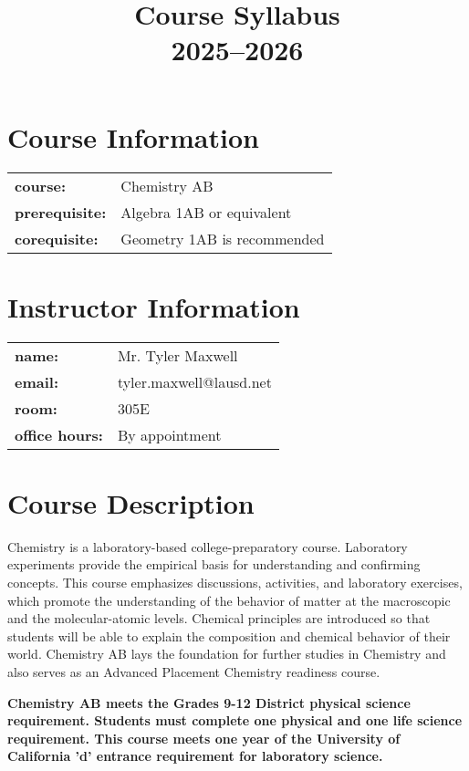 \documentclass[12pt]{article}
\title{\vspace{-1cm}\textbf{Course Syllabus}\\\large 2025–2026}
\author{}
\date{}
\begin{document}
\maketitle
\vspace{-5em}

\section*{Course Information}
\begin{tabular}{ll}
\textbf{course:} & Chemistry AB \\
\textbf{prerequisite:} & Algebra 1AB or equivalent \\
\textbf{corequisite:} & Geometry 1AB is recommended\\
\end{tabular}


\section*{Instructor Information}
\begin{tabular}{ll}
\textbf{name:} & Mr. Tyler Maxwell \\
\textbf{email:} & tyler.maxwell@lausd.net \\
\textbf{room:} & 305E \\
\textbf{office hours:} & By appointment
\end{tabular}

\section*{Course Description}
Chemistry is a laboratory-based college-preparatory course. Laboratory experiments provide the empirical basis for understanding and confirming concepts. This course emphasizes discussions, activities, and laboratory exercises, which promote the understanding of the behavior of matter at the macroscopic and the molecular-atomic levels. Chemical principles are introduced so that students will be able to explain the composition and chemical behavior of their world. Chemistry AB lays the foundation for further studies in Chemistry and also serves as an Advanced Placement Chemistry readiness course. 

\textbf{Chemistry AB meets the Grades 9-12 District physical science requirement. Students must complete one physical and one life science requirement. This course meets one year of the University of California 'd' entrance requirement for laboratory science.}
\end{document}
